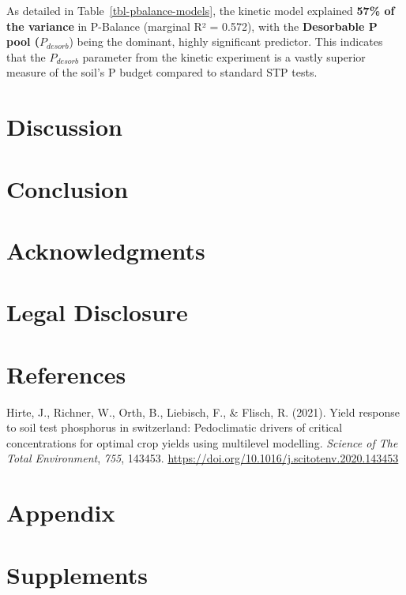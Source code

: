 \documentclass[
  a4paper,
]{article}
\newlength{\cslhangindent}
\newenvironment{CSLReferences}[2] %
 {\begin{list}{}{%
  \setlength{\itemindent}{0pt}
  \setlength{\leftmargin}{0pt}
  \setlength{\parsep}{0pt}
  \ifodd #1
   \setlength{\leftmargin}{\cslhangindent}
   \setlength{\itemindent}{-1\cslhangindent}
  \fi
  \setlength{\itemsep}{#2\baselineskip}}}
 {\end{list}}
\begin{document}
As detailed in Table~\ref{tbl-pbalance-models}, the kinetic model
explained \textbf{57\% of the variance} in P-Balance (marginal R² =
0.572), with the \textbf{Desorbable P pool (}\(P_{desorb}\)) being the
dominant, highly significant predictor. This indicates that the
\(P_{desorb}\) parameter from the kinetic experiment is a vastly
superior measure of the soil's P budget compared to standard STP tests.

\section{Discussion}\label{discussion}

\section{Conclusion}\label{conclusion}

\section{Acknowledgments}\label{acknowledgments}

\section{Legal Disclosure}\label{legal-disclosure}

\section{References}\label{references}

\label{refs}
\begin{CSLReferences}{1}{0}
Hirte, J., Richner, W., Orth, B., Liebisch, F., \& Flisch, R. (2021).
Yield response to soil test phosphorus in switzerland: Pedoclimatic
drivers of critical concentrations for optimal crop yields using
multilevel modelling. \emph{Science of The Total Environment},
\emph{755}, 143453.
\url{https://doi.org/10.1016/j.scitotenv.2020.143453}

\end{CSLReferences}

\section{Appendix}\label{appendix}

\section{Supplements}\label{supplements}
\end{document}
